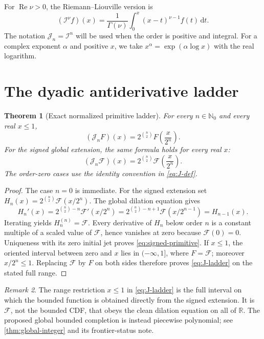 \documentclass[11pt,oneside]{article}
\newtheorem{theorem}{Theorem}[section]
\theoremstyle{definition}
\theoremstyle{remark}
\newtheorem{remark}[theorem]{Remark}
\newcommand{\Fs}{\mathcal F}
\newcommand{\R}{\mathbb R}
\newcommand{\N}{\mathbb N}
\newcommand{\dd}{\,\mathrm d}
\newcommand{\Jn}{\mathcal J}
\newcommand{\RL}{\mathcal I}
\newcommand{\1}{\mathbf 1}
\DeclareMathOperator{\Rea}{Re}
\begin{document}
For \(\Rea\nu>0\), the Riemann--Liouville version is
\begin{equation}
 (\RL^\nu f)(x)=\frac1{\Gamma(\nu)}
 \int_0^x(x-t)^{\nu-1}f(t)\dd t.                               \label{eq:RL-def}
\end{equation}
The notation \(\Jn_n=\RL^n\) will be used when the order is positive and
integral.
For a complex exponent \(\alpha\) and positive \(x\), we take
\(x^\alpha=\exp(\alpha\log x)\) with the real logarithm.

\section{The dyadic antiderivative ladder}

\begin{theorem}[Exact normalized primitive ladder]\label{thm:ladder}
For every \(n\in\N_0\) and every real \(x\leq1\),
\begin{equation}
 \boxed{\quad
 (\Jn_nF)(x)=2^{\binom n2}F\!\left(\frac{x}{2^n}\right).
 \quad}                                                        \label{eq:J-ladder}
\end{equation}
For the signed global extension, the same formula holds for every real \(x\):
\begin{equation}
 (\Jn_n\Fs)(x)=2^{\binom n2}\Fs\!\left(\frac{x}{2^n}\right).              \label{eq:signed-primitive}
\end{equation}
The order-zero cases use the identity convention in \eqref{eq:J-def}.
\end{theorem}

\begin{proof}
The case \(n=0\) is immediate.  For the signed extension set
\(H_n(x)=2^{\binom n2}\Fs(x/2^n)\).  The global dilation equation gives
\[
 H_n'(x)
 =2^{\binom n2-n}\Fs'(x/2^n)
 =2^{\binom n2-n+1}\Fs(x/2^{n-1})
 =H_{n-1}(x).
\]
Iterating yields \(H_n^{(n)}=\Fs\).  Every derivative of \(H_n\) below order
\(n\) is a constant multiple of a scaled value of \(\Fs\), hence vanishes at
zero because \(\Fs(0)=0\).  Uniqueness with its zero initial jet proves
\eqref{eq:signed-primitive}.  If \(x\leq1\), the oriented interval between
zero and \(x\) lies in \(( -\infty,1]\), where \(F=\Fs\); moreover
\(x/2^n\leq1\).  Replacing \(\Fs\) by \(F\) on both sides therefore proves
\eqref{eq:J-ladder} on the stated full range.
\end{proof}

\begin{remark}
The range restriction \(x\leq1\) in \eqref{eq:J-ladder} is the full interval
on which the bounded function is obtained directly from the signed extension.
It is \(\Fs\), not the bounded CDF, that obeys the clean dilation equation on
all of \(\R\).  The proposed global bounded completion is instead piecewise
polynomial; see \cref{thm:global-integer} and its frontier-status note.
\end{remark}
\end{document}
